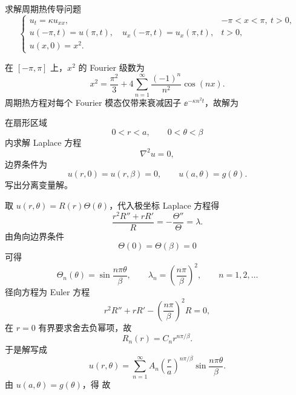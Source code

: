 \begin{question}
求解周期热传导问题
\[
\begin{cases}
 u_t=\kappa u_{xx}, & -\pi<x<\pi,\ t>0,\\
 u(-\pi,t)=u(\pi,t),\quad u_x(-\pi,t)=u_x(\pi,t), & t>0,\\
 u(x,0)=x^2.
\end{cases}
\]
\begin{solution}

在 $[-\pi,\pi]$ 上，$x^2$ 的 Fourier 级数为
\[
x^2=\frac{\pi^2}{3}+4\sum_{n=1}^{\infty}\frac{(-1)^n}{n^2}\cos(nx).
\]
周期热方程对每个 Fourier 模态仅带来衰减因子 $\ee^{-\kappa n^2t}$，故解为
\end{solution}
\end{question}

\begin{question}
在扇形区域
\[
0<r<a,\qquad 0<\theta<\beta
\]
内求解 Laplace 方程
\[
\nabla^2u=0,
\]
边界条件为
\[
u(r,0)=u(r,\beta)=0,
\qquad
u(a,\theta)=g(\theta).
\]
写出分离变量解。
\begin{solution}

取 $u(r,\theta)=R(r)\Theta(\theta)$，代入极坐标 Laplace 方程得
\[
\frac{r^2R''+rR'}{R}=-\frac{\Theta''}{\Theta}=\lambda.
\]
由角向边界条件
\[
\Theta(0)=\Theta(\beta)=0
\]
可得
\[
\Theta_n(\theta)=\sin\frac{n\pi\theta}{\beta},
\qquad
\lambda_n=\left(\frac{n\pi}{\beta}\right)^2,
\qquad n=1,2,\dots
\]
径向方程为 Euler 方程
\[
r^2R''+rR'-\left(\frac{n\pi}{\beta}\right)^2R=0,
\]
在 $r=0$ 有界要求舍去负幂项，故
\[
R_n(r)=C_n r^{n\pi/\beta}.
\]
于是解写成
\[
u(r,\theta)=\sum_{n=1}^{\infty}A_n\left(\frac{r}{a}\right)^{n\pi/\beta}\sin\frac{n\pi\theta}{\beta}.
\]
由 $u(a,\theta)=g(\theta)$，得
故
\end{solution}
\end{question}


